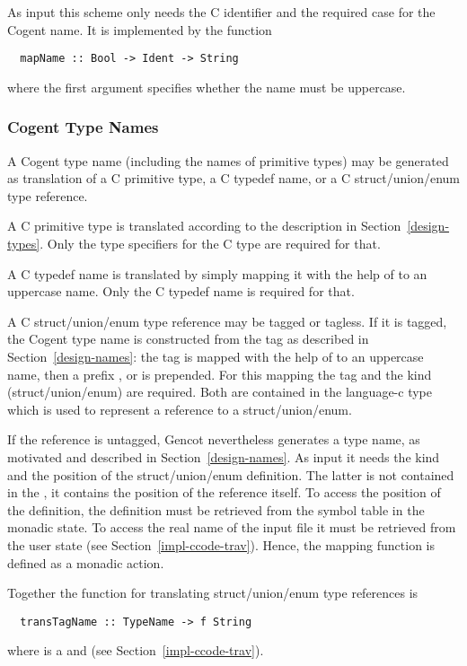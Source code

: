As input this scheme only needs the C identifier and the required case for the Cogent name.
It is implemented by the function
\begin{verbatim}
  mapName :: Bool -> Ident -> String
\end{verbatim}
where the first argument specifies whether the name must be uppercase.

\subsubsection{Cogent Type Names}

A Cogent type name (including the names of primitive types) may be generated as translation of a C 
primitive type, a C typedef name, or a C struct/union/enum type reference. 

A C primitive type is translated according to the description in Section~\ref{design-types}. Only the
type specifiers for the C type are required for that.

A C typedef name is translated by simply mapping it with the help of  to an uppercase name.
Only the C typedef name is required for that.

A C struct/union/enum type reference may be tagged or tagless. If it is tagged, the Cogent type name is
constructed from the tag as described in Section~\ref{design-names}: the tag is mapped with the help of
 to an uppercase name, then a prefix ,  or  is 
prepended. For this mapping the tag and the kind (struct/union/enum) are required. Both are contained
in the language-c type  which is used to represent a reference to a struct/union/enum.

If the reference is untagged, Gencot nevertheless generates a type name, as motivated and described 
in Section~\ref{design-names}. As input it needs the kind and the position of the struct/union/enum 
definition. The latter is not contained in the , it contains the position of the reference
itself. To access the position of the definition, the definition must be retrieved from the symbol table
in the monadic state. To access the real name of the input file it must be retrieved from the user
state (see Section~\ref{impl-ccode-trav}). Hence, the mapping function is defined as a monadic action. 

Together the function for translating struct/union/enum type references is
\begin{verbatim}
  transTagName :: TypeName -> f String
\end{verbatim}
where  is a  and  (see Section~\ref{impl-ccode-trav}).

